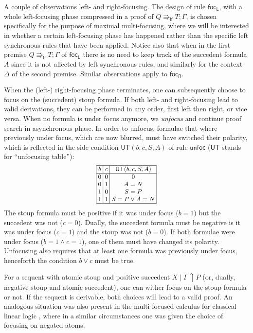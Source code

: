 \documentclass[runningheads]{llncs}
\newcommand{\I}{\mathsf{I}}
\newcommand{\lf}{\Rrightarrow_\mathsf{lf}}
\newcommand{\UT}{\mathsf{UT}}
\newcommand{\up}{\Uparrow}
\newcommand{\focL}{\mathsf{foc_L}}
\newcommand{\focR}{\mathsf{foc_R}}
\newcommand{\unfoc}{\mathsf{unfoc}}
\begin{document}
A couple of observations left- and right-focusing. The design of rule $\focL$, with a whole left-focusing phase compressed in a proof of $Q \lf T ; \Gamma$, is chosen specifically for the purpose of maximal multi-focusing, where we will be interested in whether a certain left-focusing phase has happened rather than the specific left synchronous rules that have been applied. Notice also that when in the first premise $Q \lf T ; \Gamma$ of $\focL$ there is no need to keep track of the succedent formula $A$ since it is not affected by left synchronous rules, and similarly for the context $\Delta$ of the second premise. Similar observations apply to $\focR$.


When the (left-) right-focusing phase terminates, one can subsequently choose to focus on the (succedent) stoup formula. If both left- and right-focusing lead to valid derivations, they can be performed in any order, first left then right, or vice versa. When no formula is under focus anymore, we \emph{unfocus} and continue proof search in asynchronous phase. In order to unfocus, formulae that where previously under focus, which are now blurred, must have switched their polarity, which is reflected in the side condition $\UT(b,c,S,A)$ of rule $\unfoc$ ($\UT$ stands for ``unfocusing table''):
\[\small
\begin{array}{|@{\;}c@{\;}|@{\;}c@{\;}|@{\;}c@{\;}|}
  \hline
b & c & \UT(b,c,S,A) \\
\hline
0 & 0 & 0 \\
0 & 1 & A = N \\
1 & 0 & S = P \\
1 & 1 & S = P \vee A = N\\
  \hline
\end{array}
\]
The stoup formula must be positive if it was under focus ($b=1$) but the succedent was not ($c=0$). Dually, the succedent formula must be negative is it was under focus ($c = 1$) and the stoup was not ($b = 0$). If both formulae were under focus ($b = 1 \wedge c = 1$), one of them must have changed its polarity. Unfocusing also requires that at least one formula was previously under focus, henceforth the condition $b \vee c$ must be true.

For a sequent with atomic stoup and positive succedent $X \mid \Gamma \up P$ (or, dually, negative stoup and atomic succedent), one can wither focus on the stoup formula or not. If the sequent is derivable, both choices will lead to a valid proof. An analogous situation was also present in the multi-focused calculus for classical linear logic \cite{chaudhuri:canonical:2008}, where in a similar circumstances one was given the choice of focusing on negated atoms.
\end{document}
